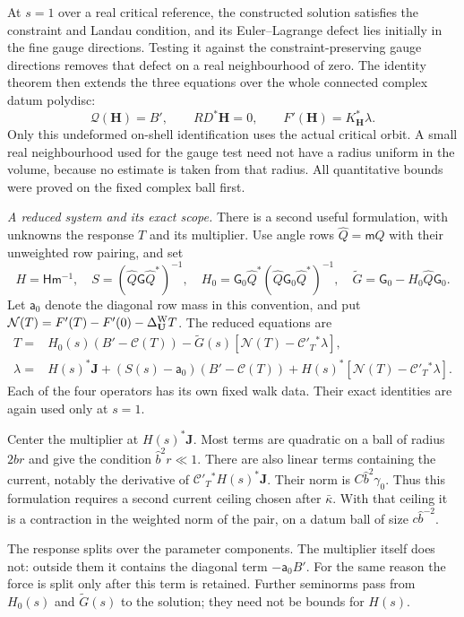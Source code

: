 \documentclass[11pt,letterpaper,reqno]{amsart}
\theoremstyle{definition}
\theoremstyle{remark}
\begin{document}
At $s=1$ over a real critical reference,
the constructed solution satisfies the
constraint and Landau condition, and its
Euler--Lagrange defect lies initially in
the fine gauge directions. Testing it
against the constraint-preserving gauge
directions removes that defect on a real
neighbourhood of zero. The identity theorem
then extends the three equations over the
whole connected complex datum polydisc:
\[
 \mathcal Q(\mathbf H)=B',\qquad
 RD^*\mathbf H=0,\qquad
 F'(\mathbf H)=K_{\mathbf H}^*\lambda.
\]
Only this undeformed on-shell identification
uses the actual critical orbit. A small real
neighbourhood used for the gauge test need
not have a radius uniform in the volume,
because no estimate is taken from that
radius. All quantitative bounds were
proved on the fixed complex ball first.

\emph{A reduced system and its exact scope.}
There is a second useful formulation,
with unknowns the response $T$ and its
multiplier. Use angle rows
$\widehat Q=\mathsf mQ$ with their unweighted
row pairing, and set
\[
 H=\mathsf H\mathsf m^{-1},\quad
 S=(\widehat Q\mathsf G\widehat Q^*)^{-1},\quad
 H_0=\mathsf G_0\widehat Q^*
                 (\widehat Q\mathsf G_0\widehat Q^*)^{-1},\quad
 \widetilde G=\mathsf G_0-H_0\widehat Q\mathsf G_0.
\]
Let $\mathsf a_0$ denote the diagonal
row mass in this convention, and put
$\mathcal N(T)=F'(T)-F'(0)-\Delta^{\rm W}_{\mathbf U}T$.
The reduced equations are
\[
 \begin{split}
 T={}&H_0(s)(B'-\mathcal C(T))
       -\widetilde G(s)[\mathcal N(T)-\mathcal C'_T{}^*\lambda],\\
 \lambda={}&H(s)^*\mathbf J
      +(S(s)-\mathsf a_0)(B'-\mathcal C(T))
       +H(s)^*[\mathcal N(T)-\mathcal C'_T{}^*\lambda].
 \end{split}
\]
Each of the four operators has its own
fixed walk data. Their exact identities
are again used only at $s=1$.

Center the multiplier at $H(s)^*\mathbf J$.
Most terms are quadratic on a ball of
radius $2\widehat b r$ and give the
condition $\widehat b^2r\ll1$.
There are also linear terms containing
the current, notably the derivative of
$\mathcal C'_T{}^*H(s)^*\mathbf J$.
Their norm is $C\widehat b^2\gamma_0$.
Thus this formulation requires a second
current ceiling chosen after
$\bar\kappa$. With that ceiling it
is a contraction in the weighted norm
of the pair, on a datum ball of size
$c\widehat b^{-2}$.

The response splits over the parameter
components. The multiplier itself does
not: outside them it contains the
diagonal term $-\mathsf a_0B'$.
For the same reason the force is
split only after this term is retained.
Further seminorms pass from $H_0(s)$
and $\widetilde G(s)$ to the solution;
they need not be bounds for $H(s)$.
\end{document}
